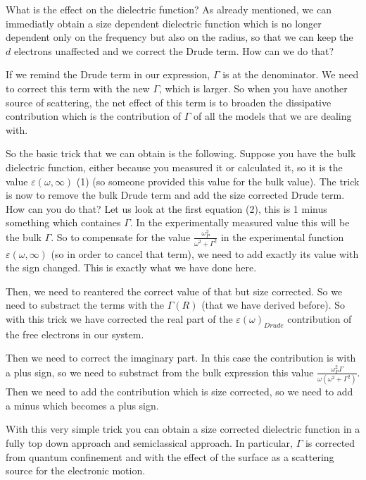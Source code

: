 \documentclass[../main/main.tex]{subfiles}
\begin{document}
What is the effect on the dielectric function? As already mentioned, we can immediatly obtain a size dependent dielectric function which is no longer dependent only on the frequency but also on the radius, so that we can keep the \( d \) electrons unaffected and we correct the Drude term.
How can we do that?

If we remind the Drude term in our expression, \( \Gamma  \) is at the denominator. We need to correct this term with the new \( \Gamma  \), which is larger. So when you have another source of scattering, the net effect of this term is to broaden the  dissipative contribution which is the contribution of \( \Gamma  \) of all the models that we are dealing with.

So the basic trick that we can obtain is the following. Suppose you have the bulk dielectric function, either because you measured it or calculated it, so it is the value \( \varepsilon (\omega, \infty ) \) (1) (so someone provided this value for the bulk value).
The trick is now to remove the bulk Drude term and add the size corrected Drude term. How can you do that? Let us look at the first equation (2), this is 1 minus something which containes \( \Gamma  \). In the experimentally measured value this will be the bulk \( \Gamma  \). So to compensate for the value \( \frac{\omega _P^2}{\omega ^2 + \Gamma ^2} \) in the experimental function \( \varepsilon (\omega, \infty ) \) (so in order to cancel that term), we need to add exactly its value with the sign changed. This is exactly what we have done here.

Then, we need to reantered the correct value of that but size corrected. So we need to substract the terms with the \( \Gamma (R) \) (that we have derived before). So with this trick we have corrected the real part of the \( \varepsilon (\omega )_{Drude} \) contribution of the free electrons in our system.

Then we need to correct the imaginary part. In this case the contribution is with a plus sign, so we need to substract from the bulk expression this value \( \frac{\omega _P^2 \Gamma }{\omega (\omega ^2 + \Gamma ^2)} \). Then we need to add the contribution which is size corrected, so we need to add a minus which becomes a plus sign.

With this very simple trick you can obtain a size corrected dielectric function in a fully top down approach and semiclassical approach. In particular, \( \Gamma  \) is corrected from quantum confinement and with the effect of the surface as a scattering source for the electronic motion.
\end{document}
